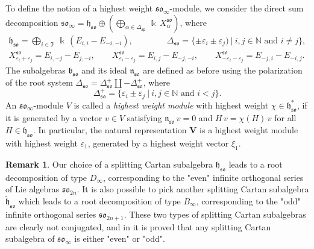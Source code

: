 \documentclass[12pt,reqno]{amsart}
\numberwithin{equation}{section}
\theoremstyle{plain}
\theoremstyle{definition}
\newtheorem{rem}{Remark}
\def\N{\mathbb N}
\def\eps{\varepsilon}
\def\so{\mathfrak{so}}
\def\sp{\mathfrak{sp}}
\def\a{\alpha}
\def\b{\mathfrak b}
\def\h{\mathfrak h}
\def\n{\mathfrak n}
\def\VV{\mathbf V}
\def\({\left(}
\def\){\right)}
\begin{document}
To define the notion of a highest weight $\so_\infty$-module, we
consider the direct sum decomposition $\so_\infty = \h_\so \oplus
\( \bigoplus_{\a \in \Delta_{\sp}} \, \Bbbk \, X_\a^{\so} \)$, where
\begin{gather*}
    \h_\so = \bigoplus_{i \in \mathfrak I} \ \Bbbk \, (E_{i,i} - E_{-i,-i}),
    \qquad\qquad
    \Delta_\so = \{ \pm \eps_i \pm \eps_j) \ | \ i,j \in \N \text{ and } i \ne j \},
    \\
    X_{\eps_i+\eps_j}^{\so} = E_{i,-j} - E_{j,-i}, \qquad
    X_{\eps_i-\eps_j}^{\so} = E_{i,j} - E_{ -j,  -i}, \qquad
    X_{-\eps_i-\eps_j}^{\so} = E_{-j,i} - E_{-i,j}.
\end{gather*}
The subalgebras $\b_\so$ and its ideal $\n_\so$ are defined as
before using the polarization of the root system $\Delta_\so =
\Delta_\so^+ \coprod -\Delta_\so^+$, where
\begin{equation*}
    \Delta_\so^+ = \{ \eps_i \pm \eps_j \ | \ i,j \in \N \text{ and } i < j \}.
\end{equation*}
An $\so_\infty$-module $V$ is called a {\it highest weight module} with
highest weight $\chi \in \h_\so^*$, if it is generated by a vector
$v\in V$ satisfying $\n_\so \, v = 0$ and $H \, v = \chi(H)\, v$ for
all $H \in \h_\so$. In particular, the natural representation $\VV$
is a highest weight module with highest weight $\eps_1$, generated
by a highest weight vector $\xi_1$.

\begin{rem}
Our choice of a splitting Cartan subalgebra $\h_\so$ leads to a
root decomposition of type $D_\infty$, corresponding to the "even"
infinite orthogonal series of Lie algebras $\so_{2n}$. It is also possible to
pick another splitting Cartan subalgebra $\tilde{\h}_\so$ which leads
to a root decomposition of type $B_\infty$, corresponding to the
"odd" infinite orthogonal series $\so_{2n+1}$. These two types of splitting Cartan subalgebras
are clearly not conjugated, and in \cite{DPS} it is proved that any splitting Cartan subalgebra of $\so_\infty$ is either "even" or "odd".
\end{rem}

\medskip
\end{document}
